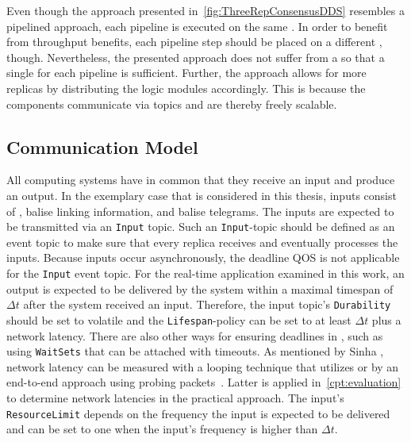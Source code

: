 Even though the approach presented in~\autoref{fig:ThreeRepConsensusDDS} resembles a pipelined approach, each pipeline is executed on the same .
In order to benefit from throughput benefits, each pipeline step should be placed on a different , though.
Nevertheless, the presented approach does not suffer from a \ChallengeThrough so that a single  for each pipeline is sufficient.
Further, the approach allows for more replicas by distributing the logic modules accordingly.
This is because the components communicate via  topics and are thereby freely scalable.

\subsection{Communication Model}
All computing systems have in common that they receive an input and produce an output.
In the exemplary case that is considered in this thesis, inputs consist of , balise linking information, and balise telegrams.
The inputs are expected to be transmitted via an \texttt{Input}  topic.
Such an \texttt{Input}-topic should be defined as an event topic to make sure that every replica receives and eventually processes the inputs.
Because inputs occur asynchronously, the deadline \gls*{QOS} is not applicable for the \texttt{Input} event topic.
For the real-time application examined in this work, an output is expected to be delivered by the system within a maximal timespan of $\Delta t$ after the system received an input.
Therefore, the input topic's \texttt{Durability} should be set to volatile and the \texttt{Lifespan}-policy can be set to at least $\Delta t$ plus a network latency.
There are also other ways for ensuring deadlines in , such as using \texttt{WaitSets} that can be attached with timeouts.
As mentioned by Sinha \etal, network latency can be measured with a looping technique that utilizes   or by an end-to-end approach using probing packets~\cite{SinhaMeasureNetworkLatency}.
Latter is applied in~\autoref{cpt:evaluation} to determine network latencies in the practical approach.
The input's \texttt{ResourceLimit} depends on the frequency the input is expected to be delivered and can be set to one when the input's frequency is higher than $\Delta t$.
\\

